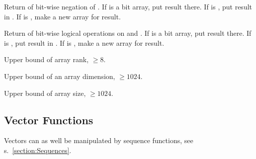 \begin{LIST}{1cm}
  Return  of bit-wise negation of . If
   is a bit array, put result there. If  is \T, put
  result in . If  is \NIL, make a new array for
  result. 

  Return  of bit-wise logical operations on
   and  . If  is a bit
  array, put result there. If  is \T, put result in
  . If  is \NIL, make a new array for
  result. 

  Upper bound of array rank, $\geq 8$.

  Upper bound of an array dimension, $\geq 1024$.

  Upper bound of array size, $\geq 1024$.

\end{LIST}


\subsection{Vector Functions} 

Vectors can as well be manipulated by sequence functions, see
s.\ \ref{section:Sequences}. 

